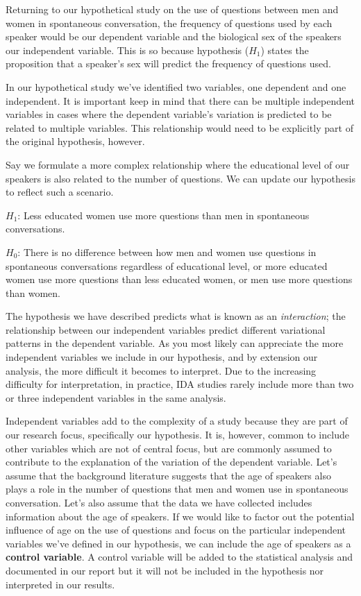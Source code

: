 \documentclass[
  letterpaper,
]{latex/krantz}
\begin{document}
Returning to our hypothetical study on the use of questions between men
and women in spontaneous conversation, the frequency of questions used
by each speaker would be our dependent variable and the biological sex
of the speakers our independent variable. This is so because hypothesis
(\(H_1\)) states the proposition that a speaker's sex will predict the
frequency of questions used.

In our hypothetical study we've identified two variables, one dependent
and one independent. It is important keep in mind that there can be
multiple independent variables in cases where the dependent variable's
variation is predicted to be related to multiple variables. This
relationship would need to be explicitly part of the original
hypothesis, however.

Say we formulate a more complex relationship where the educational level
of our speakers is also related to the number of questions. We can
update our hypothesis to reflect such a scenario.

\(H_1\): Less educated women use more questions than men in spontaneous
conversations.

\(H_0\): There is no difference between how men and women use questions
in spontaneous conversations regardless of educational level, or more
educated women use more questions than less educated women, or men use
more questions than women.

The hypothesis we have described predicts what is known as an
\emph{interaction}; the relationship between our independent variables
predict different variational patterns in the dependent variable. As you
most likely can appreciate the more independent variables we include in
our hypothesis, and by extension our analysis, the more difficult it
becomes to interpret. Due to the increasing difficulty for
interpretation, in practice, IDA studies rarely include more than two or
three independent variables in the same analysis.

Independent variables add to the complexity of a study because they are
part of our research focus, specifically our hypothesis. It is, however,
common to include other variables which are not of central focus, but
are commonly assumed to contribute to the explanation of the variation
of the dependent variable. Let's assume that the background literature
suggests that the age of speakers also plays a role in the number of
questions that men and women use in spontaneous conversation. Let's also
assume that the data we have collected includes information about the
age of speakers. If we would like to factor out the potential influence
of age on the use of questions and focus on the particular independent
variables we've defined in our hypothesis, we can include the age of
speakers as a \textbf{control variable}. A control variable will be
added to the statistical analysis and documented in our report but it
will not be included in the hypothesis nor interpreted in our results.
\end{document}
